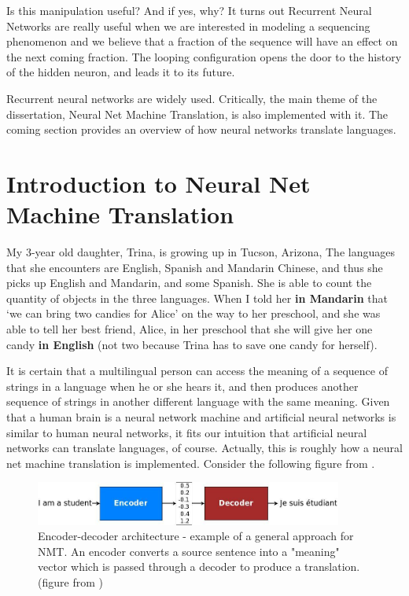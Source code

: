 \documentclass[final]{ua-thesis}
\numberwithin{equation}{section}
\begin{document}
Is this manipulation useful? And if yes, why? It turns out Recurrent Neural Networks are really useful when we are interested in modeling a sequencing phenomenon and we believe that a fraction of the sequence will have an effect on the next coming fraction. The looping configuration opens the door to the history of the hidden neuron, and leads it to its future. 

Recurrent neural networks are widely used. Critically, the main theme of the dissertation, Neural Net Machine Translation, is also implemented with it. The coming section provides an overview of how neural networks translate languages. 

\section{Introduction to Neural Net Machine Translation}

My 3-year old daughter, Trina, is growing up in Tucson, Arizona, The languages that she encounters are English, Spanish and Mandarin Chinese, and thus she picks up English and Mandarin, and some Spanish. She is able to count the quantity of objects in the three languages. When I told her \textbf{in  Mandarin} that `we can bring two candies for Alice' on the way to her preschool, and she was able to tell her best friend, Alice, in her preschool that she will give her one candy \textbf{in English} (not two because Trina has to save one candy for herself).        

It is certain that a multilingual person can access the meaning of a sequence of strings in a language when he or she hears it, and then produces another sequence of strings in another different language with the same meaning. Given that a human brain is a neural network machine and artificial neural networks is similar to human neural networks, it fits our intuition that artificial neural networks can translate languages, of course. Actually, this is roughly how a neural net machine translation is implemented. Consider the following figure from \citet{luong17GitHub}.

\begin{figure}[h]
\caption{Encoder-decoder architecture - example of a general approach for NMT. An encoder converts a source sentence into a "meaning" vector which is passed through a decoder to produce a translation. (figure from \citet{luong17GitHub})}
\centering
\includegraphics[width=0.9\textwidth]{encdec.jpg}
\end{figure} 
\end{document}
